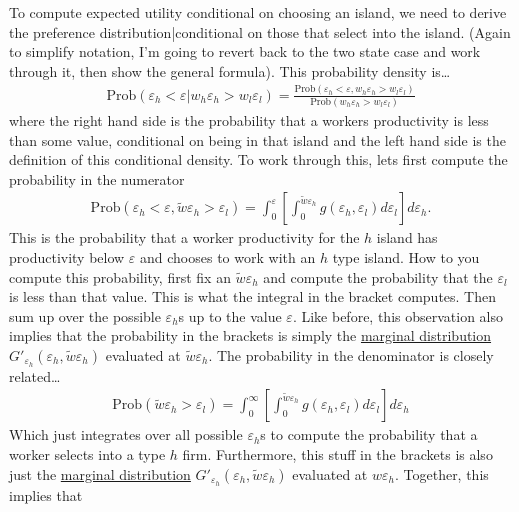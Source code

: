 \documentclass[pdftex,12pt]{article}
\begin{document}
\medskip
\noindent To compute expected utility conditional on choosing an island, we need to derive the preference distribution|conditional on those that select into the island. (Again to simplify notation, I'm going to revert back to the two state case and work through it, then show the general formula). This probability density is\ldots
\begin{align}
\mathrm{Prob}\left( \varepsilon_h < \varepsilon | w_h \varepsilon_h >  w_l\varepsilon_l\right) = \frac{\mathrm{Prob}\left( \varepsilon_h < \varepsilon , w_h \varepsilon_h >  w_l\varepsilon_l\right)}{\mathrm{Prob}\left(w_h \varepsilon_h >  w_l\varepsilon_l\right)}
\end{align}
where the right hand side is the probability that a workers productivity is less than some value, conditional on being in that island and the left hand side is the definition of this conditional density. To work through this, lets first compute the probability in the numerator
\begin{align}
\mathrm{Prob}\left( \varepsilon_h < \varepsilon , \tilde w \varepsilon_h > \varepsilon_l\right) = \int_0^{\varepsilon}\left[\int_0^{\tilde w\varepsilon_h}g(\varepsilon_h,\varepsilon_l)d\varepsilon_l\right]d\varepsilon_h.
\end{align}
This is the probability that a worker productivity for the $h$ island has productivity below $\varepsilon$ and chooses to work with an $h$ type island. How to you compute this probability, first fix an $\tilde w\varepsilon_h$ and compute the probability that the $\varepsilon_l$ is less than that value. This is what the integral in the bracket computes. Then sum up over the possible $\varepsilon_h$s up to the value $\varepsilon$. Like before, this observation also implies that the probability in the brackets is simply the \href{https://en.wikipedia.org/wiki/Marginal_distribution}{marginal distribution} $G'_{\varepsilon_h}(\varepsilon_h, \tilde w\varepsilon_h)$ evaluated at $\tilde w\varepsilon_h$. The probability in the denominator is closely related\ldots
\begin{align}
\mathrm{Prob}\left(\tilde w \varepsilon_h > \varepsilon_l\right) = \int_0^{\infty}\left[\int_0^{\tilde w\varepsilon_h}g(\varepsilon_h,\varepsilon_l)d\varepsilon_l\right]d\varepsilon_h
\end{align}
Which just integrates over all possible $\varepsilon_h$s to compute the probability that a worker selects into a type $h$ firm. Furthermore, this stuff in the brackets is also just the \href{https://en.wikipedia.org/wiki/Marginal_distribution}{marginal distribution} $G'_{\varepsilon_h}(\varepsilon_h,\tilde w\varepsilon_h)$ evaluated at $w\varepsilon_h$. Together, this implies that
\end{document}
